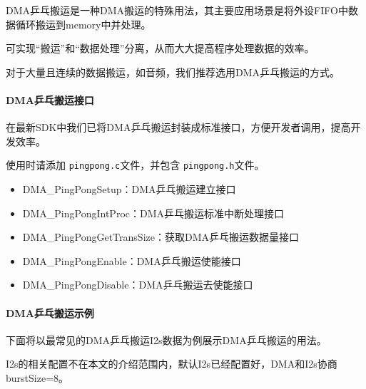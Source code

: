 \documentclass[
  12pt,
]{book}
\begin{document}
DMA乒乓搬运是一种DMA搬运的特殊用法，其主要应用场景是将外设FIFO中数据循环搬运到memory中并处理。

可实现``搬运''和``数据处理''分离，从而大大提高程序处理数据的效率。

对于大量且连续的数据搬运，如音频，我们推荐选用DMA乒乓搬运的方式。

\hypertarget{dmaux4e52ux4e53ux642cux8fd0ux63a5ux53e3}{%
\paragraph{DMA乒乓搬运接口}\label{dmaux4e52ux4e53ux642cux8fd0ux63a5ux53e3}}

在最新SDK中我们已将DMA乒乓搬运封装成标准接口，方便开发者调用，提高开发效率。

使用时请添加 \texttt{pingpong.c}文件，并包含 \texttt{pingpong.h}文件。

\begin{itemize}
\item
  DMA\_PingPongSetup：DMA乒乓搬运建立接口
\item
  DMA\_PingPongIntProc：DMA乒乓搬运标准中断处理接口
\item
  DMA\_PingPongGetTransSize：获取DMA乒乓搬运数据量接口
\item
  DMA\_PingPongEnable：DMA乒乓搬运使能接口
\item
  DMA\_PingPongDisable：DMA乒乓搬运去使能接口
\end{itemize}

\hypertarget{dmaux4e52ux4e53ux642cux8fd0ux793aux4f8b}{%
\paragraph{DMA乒乓搬运示例}\label{dmaux4e52ux4e53ux642cux8fd0ux793aux4f8b}}

下面将以最常见的DMA乒乓搬运I2s数据为例展示DMA乒乓搬运的用法。

I2s的相关配置不在本文的介绍范围内，默认I2s已经配置好，DMA和I2s协商burstSize=8。
\end{document}
